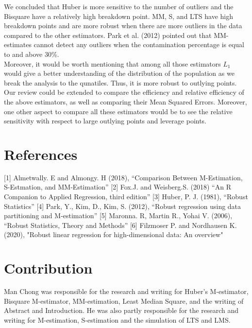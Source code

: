 \documentclass[conference]{IEEEtran}
\begin{document}
We concluded that Huber is more sensitive to the number of outliers and the Bisquare have a relatively high breakdown point. MM, S, and LTS have high breakdown points and are more robust when there are more outliers in the data compared to the other estimators. Park et al. (2012) pointed out that MM-estimates cannot detect any outliers when the contamination percentage is equal to and above 30\%.\\
Moreover, it would be worth mentioning that among all those estimators $L_1$ would give a better understanding of the distribution of the population as we break the analysis to the qunatiles. Thus, it is more robust to outlying points.\\

Our review could be extended to compare the efficiency and relative efficiency of the above estimators, as well as comparing their Mean Squared Errors. Moreover, one other aspect to compare all these estimators would be to see the relative sensitivity with respect to large outlying points and leverage points.\\

\section{References}
\bibitem{}
[1] Almetwally. E and Almongy. H (2018),
\newblock “Comparison Between M-Estimation, S-Estmation, and MM-Estimation”
\bibitem{}
[2] Fox.J. and Weisberg.S.  (2018)
\newblock “An R Companion to Applied Regression, third edition”
\bibitem{}
[3] Huber, P. J. (1981),
\newblock “Robust Statistics”
\bibitem{}
[4] Park, Y., Kim, D., Kim, S. (2012),
\newblock “Robust regression using data partitioning and M-estimation”
\bibitem{}
[5] Maronna. R, Martin R., Yohai V. (2006),
\newblock “Robust Statistics, Theory and Methods”
\bibitem{}
[6] Filzmoser P. and Nordhausen K. (2020),
\newblock "Robust linear regression for high-dimensional data: An overview"

\section{Contribution}
Man Chong was responsible for the research and writing for Huber's M-estimator, Bisquare M-estimator, MM-estimation, Least Median Square, and the writing of Abstract and Introduction. He was also partly responsible for the research and writing for M-estimation, S-estimation and the simulation of LTS and LMS.
\end{document}
